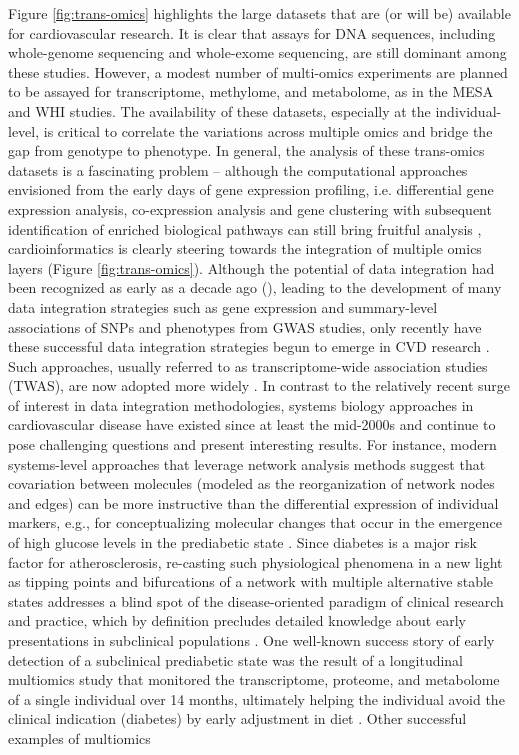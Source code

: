 \documentclass[letter]{bib}
\newcounter{example}[subsection]
\begin{document}
	 Figure \ref{fig:trans-omics} highlights the large datasets that are (or will be) available for cardiovascular research. It is clear that assays for DNA sequences, including whole-genome sequencing and whole-exome sequencing, are still dominant among these studies. However, a modest number of multi-omics experiments are planned to be assayed for transcriptome, methylome, and metabolome, as in the MESA and WHI studies. The availability of these datasets, especially at the individual-level, is critical to correlate the variations across multiple omics and bridge the gap from genotype to phenotype.  In general, the analysis of these trans-omics datasets is a fascinating problem -- although the computational approaches envisioned from the early days of gene expression profiling, i.e. differential gene expression analysis, co-expression analysis and gene clustering with subsequent identification of enriched biological pathways \citep{Claverie:1999:Computational} can still bring fruitful analysis \citep{Santolini:2018:personalized}, cardioinformatics is clearly steering towards the integration of multiple omics layers (Figure \ref{fig:trans-omics}). Although the potential of data integration had been recognized as early as a decade ago (\citep{Hawkins:2010:Nextgeneration}), leading to the development of many data integration strategies \citep{Ritchie:2015:Methods} such as gene expression and summary-level associations of SNPs and phenotypes from GWAS studies, only recently have these successful data integration strategies begun to emerge in CVD research \citep{Gusev:2016:Integrative}. Such approaches, usually referred to as transcriptome-wide association studies (TWAS), are now adopted more widely \citep{Klarin:2018:Genetics}.  In contrast to the relatively recent surge of interest in data integration methodologies, systems biology approaches in cardiovascular disease have existed since at least the mid-2000s \citep{Watson:2006:Thematic,Wu:2009:A,Lusis:2010:Cardiovascular} and continue to pose challenging questions and present interesting results.  For instance, modern systems-level approaches that leverage network analysis methods suggest that covariation between molecules (modeled as the reorganization of network nodes and edges) can be more instructive than the differential expression of individual markers, e.g., for conceptualizing molecular changes that occur in the emergence of high glucose levels in the prediabetic state \citep{Trachana:2018:Taking,Lau:2018:Omics}.  Since diabetes is a major risk factor for atherosclerosis, re-casting such physiological phenomena in a new light as tipping points and bifurcations of a network with multiple alternative stable states addresses a blind spot of the disease-oriented paradigm of clinical research and practice, which by definition precludes detailed knowledge about early presentations in subclinical populations \citep{Lau:2018:Omics}.  One well-known success story of early detection of a subclinical prediabetic state was the result of a longitudinal multiomics study that monitored the transcriptome, proteome, and metabolome of a single individual over 14 months, ultimately helping the individual avoid the clinical indication (diabetes) by early adjustment in diet \citep{Chen:2012:Personal}.  Other successful examples of multiomics 
\end{document}
